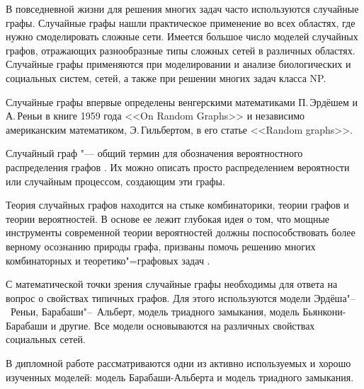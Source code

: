 \documentclass[bachelor, och, diploma]{SCWorks}
\begin{document}


\tableofcontents




\intro
В повседневной жизни для решения многих задач часто используются случайные графы. Случайные графы нашли практическое применение во всех областях, где нужно смоделировать сложные сети. Имеется большое число моделей случайных графов, отражающих разнообразные типы сложных сетей в различных областях. Случайные графы применяются при моделировании и анализе биологических и социальных систем, сетей, а также при решении многих задач класса NP.

Случайные графы впервые определены венгерскими математиками \linebreak П.\,Эрдёшем и А.\,Реньи в книге 1959 года <<On Random Graphs>>\cite{RG}  и независимо американским математиком, Э.\,Гильбертом, в его статье <<Random graphs>>\cite{RG1}.

Случайный граф "--- общий термин для обозначения вероятностного распределения графов \cite{wico}. Их можно описать просто распределением вероятности или случайным процессом, создающим эти графы. 

Теория случайных графов находится на стыке комбинаторики, теории графов и теории вероятностей. В основе ее лежит глубокая идея о том, что мощные инструменты современной теории вероятностей должны поспособствовать более верному осознанию природы графа, призваны помочь решению многих комбинаторных и теоретико"=графовых задач \cite{habr}.

С математической точки зрения случайные графы необходимы для ответа на вопрос о свойствах типичных графов. Для этого используются модели Эрдёша"--~Реньи, Барабаши"--~Альберт, модель триадного замыкания, модель Бьянкони-Барабаши и другие. Все модели основываются на различных свойствах социальных сетей.

В дипломной работе рассматриваются одни из активно используемых и хорошо изученных моделей: модель Барабаши-Альберта и модель триадного замыкания.  
\end{document}
